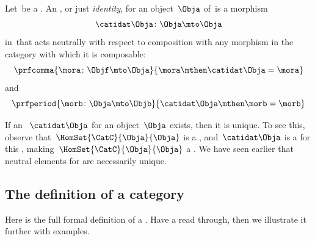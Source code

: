 \begin{ctdefinition}
    \label{def:identity-morphism}
    Let~\CatC be a .
    An , or just \emph{identity}, for an object~$\Obja$ of~\CatC is a morphism
    \begin{equation}
        \catidat\Obja \colon \Obja \mto \Obja
    \end{equation}
    in~\CatC that acts neutrally with respect to composition with any morphism in the category with which it is composable:
    \begin{equation}\label{eq:identities-unitality-1}
        \prfcomma{
            \mora \colon \Objf \mto \Obja
        }{
            \mora \mthen \catidat\Obja = \mora
        }
    \end{equation}
    and
    \begin{equation}\label{eq:identities-unitality-2}
        \prfperiod{
            \morb \colon \Obja \mto \Objb
        }{
            \catidat\Obja \mthen \morb = \morb
        }
    \end{equation}
\end{ctdefinition}

\begin{remark}
    If an ~$\catidat\Obja$ for an object~$\Obja$ exists, then it is unique.
    To see this, observe that~$\HomSet{\CatC}{\Obja}{\Obja}$ is a , and~$\catidat\Obja$ is a  for this , making~$\HomSet{\CatC}{\Obja}{\Obja}$ a .
    We have seen earlier that neutral elements for  are necessarily unique.
\end{remark}



\subsection{The definition of a category}

Here is the full formal definition of a .
Have a read through, then we illustrate it further with examples.



